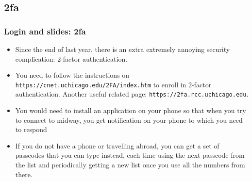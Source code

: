 \subsection{2fa}
\begin{frame}[fragile]
  \frametitle{Login and slides: 2fa}
  \begin{itemize}
  \item Since the end of last year, there is an extra extremely annoying security complication: 
    {\color{mycolordef}2-factor authentication}.
  \item You need to follow the instructions on {\color{mycolorcli}\verb|https://cnet.uchicago.edu/2FA/index.htm|} 
    to enroll in 2-factor authentication.
    Another useful related page: {\color{mycolorcli}\verb|https://2fa.rcc.uchicago.edu|}.
  \item You would need to install an application on your phone so that when you try to connect to midway, 
    you get notification on your phone to which you need to respond
  \item If you do not have a phone or travelling abroad, 
    you can get a set of passcodes that you can type instead, each time using the next passcode from the list and periodically
    getting a new list once you use all the numbers from there.
  \end{itemize}
\end{frame}


